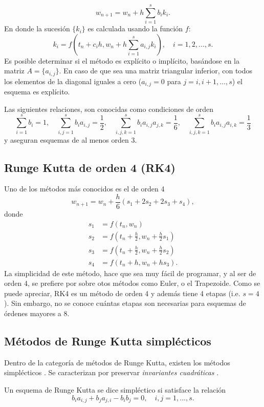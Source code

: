 \begin{equation}
    w_{n+1} = w_n + h\sum_{i=1}^sb_ik_i.
\end{equation}
En donde la sucesión $\{k_i\}$ es calculada usando la función $f$:
\begin{equation}
    k_i = f\left(t_n + c_ih, w_n + h\sum_{i=1}^sa_{i,j}k_i\right), \quad i = 1, 2, ..., s.
\end{equation}
Es posible determinar si el método es explícito o implícito, basándose en la matriz $A = \{a_{i,j}\}$. En caso de que sea una matriz triangular inferior, con todos los elementos de la diagonal iguales a cero ($a_{i,j} = 0$ para $j = i, i+1, ...,s$) el esquema es explícito.


Las siguientes relaciones, son conocidas como condiciones de orden
\begin{equation}
    \sum_{i=1}^s b_i=1, \quad \sum_{i,j=1}^sb_ia_{i,j}=\frac{1}{2}, \quad \sum_{i,j,k=1}^sb_i a_{i,j} a_{j,k}=\frac{1}{6}, \quad  \sum_{i,j,k=1}^sb_ia_{i,j}a_{i,k}=\frac{1}{3}
\end{equation}
y aseguran esquemas de al menos orden 3.

\subsection{Runge Kutta de orden 4 (RK4)}
Uno de los métodos más conocidos es el de orden 4
\begin{equation}
    w_{n+1} = w_n + \frac{h}{6}(s_1 + 2s_2 + 2s_3 + s_4),
\end{equation}
donde 
\begin{align*}
    s_1 &= f(t_n, w_n) \\
    s_2 &= f\left(t_n +\frac{h}{2}, w_n+\frac{h}{2}s_1\right)\\
    s_3 &= f\left(t_n +\frac{h}{2}, w_n+\frac{h}{2}s_2\right)\\
    s_4 &= f\left(t_n + h, w_n+hs_3\right).
\end{align*}
La simplicidad de este método, hace que sea muy fácil de programar, y al ser de orden 4, se prefiere por sobre otos métodos como Euler, o el Trapezoide. Como se puede apreciar, RK4 es un método de orden 4 y además tiene 4 etapas (i.e. $s=4$). Sin embargo, no se conoce cuántas etapas son necesarias para esquemas de órdenes mayores a 8. 
\subsection{Métodos de Runge Kutta simplécticos}
Dentro de la categoría de métodos de Runge Kutta, existen los métodos simplécticos \cite{symplecticRK}. Se caracterizan por preservar \textsl{invariantes cuadráticas} \cite{Sanz-Serna1988-mk, Lasagni1988-ov}.
\begin{definition}
    Un esquema de Runge Kutta se dice simpléctico si satisface la relación 
    \begin{equation}
        b_ia_{i,j} + b_ja_{j,i} - b_ib_j = 0, \quad i,j=1, ..., s.
    \end{equation}
\end{definition}
